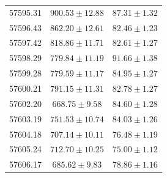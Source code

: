 \begin{table}[h]
\begin{tabular}{lcc}
		57595.31 & $900.53 \pm 12.88$ & $87.31 \pm 1.32$ \\
		57596.43 & $862.20 \pm 12.61$ & $82.46 \pm 1.23$ \\
		57597.42 & $818.86 \pm 11.71$ & $82.61 \pm 1.27$ \\
		57598.29 & $779.84 \pm 11.19$ & $91.66 \pm 1.38$ \\
		57599.28 & $779.59 \pm 11.17$ & $84.95 \pm 1.27$ \\
		57600.21 & $791.15 \pm 11.31$ & $82.78 \pm 1.27$ \\
		57602.20 & $668.75 \pm 9.58$ & $84.60 \pm 1.28$ \\
		57603.19 & $751.53 \pm 10.74$ & $84.03 \pm 1.26$ \\
		57604.18 & $707.14 \pm 10.11$ & $76.48 \pm 1.19$ \\
		57605.24 & $712.70 \pm 10.25$ & $75.00 \pm 1.12$ \\
		57606.17 & $685.62 \pm 9.83$ & $78.86 \pm 1.16$ \\
		\hline
	\end{tabular}
	\label{tab:lyo}
\end{table}
\newpage
